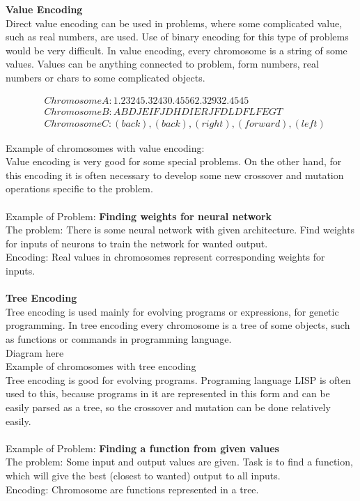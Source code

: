 \documentclass[a4paper, 12pt]{article}
\begin{document}
\textbf{Value Encoding}\\
Direct value encoding can be used in problems, where some complicated value, such as real numbers, are used. Use of binary encoding for this
type of problems would be very difficult. In value encoding, every chromosome is a string of some values. Values can be anything connected to 
problem, form numbers, real numbers or chars to some complicated objects.
\begin{center}
\begin{align*}
&Chromosome A: 1.2324  5.3243  0.4556  2.3293  2.4545\\
&Chromosome B: ABDJEIFJDHDIERJFDLDFLFEGT\\
&Chromosome C: (back), (back), (right), (forward), (left)
\end{align*}
\end{center}
Example of chromosomes with value encoding:\\
Value encoding is very good for some special problems. On the other hand, for this encoding it is often necessary to develop some new crossover and mutation operations specific to the problem.\\~\\
Example of Problem: \textbf{Finding weights for neural network}\\
The problem: There is some neural network with given architecture. Find weights for inputs of neurons to train the network for wanted output.\\
Encoding: Real values in chromosomes represent corresponding weights for inputs.\\~\\
\textbf{Tree Encoding}\\
Tree encoding is used mainly for evolving programs or expressions, for genetic programming. In tree encoding every chromosome is a tree of some objects, such as functions or commands in programming language. \\
Diagram here\\
 Example of chromosomes with tree encoding\\
Tree encoding is good for evolving programs. Programing language LISP is often used to this, because programs in it are represented in this form and can be easily parsed as a tree, so the crossover and mutation can be done relatively easily.\\~\\
Example of Problem: \textbf{Finding a function from given values}\\
The problem: Some input and output values are given. Task is to find a function, which will give the best (closest to wanted) output to all inputs.\\
Encoding: Chromosome are functions represented in a tree.
\end{document}
